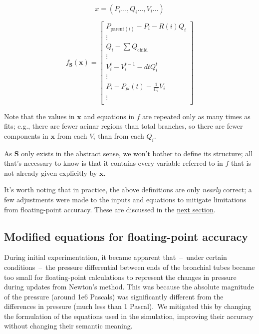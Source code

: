 \begin{equation*}
    x = (P_i..., Q_i..., V_i...)
\end{equation*}

\begin{equation*}
    f_{\bm{S}}(\bm{x}) =
        \begin{bmatrix}
            P_{\text{parent}(i)} - P_i - R(i)Q_i \\
            \vdots \\
            Q_i - \sum Q_{\text{child}} \\
            \vdots \\
            V_i^t - V_i^{t-1} - dtQ_i^t \\
            \vdots \\
            P_i - P_{pl}(t) - \frac{1}{C_i} V_i \\
            \vdots \\
        \end{bmatrix}
\end{equation*}

Note that the values in $\bm{x}$ and equations in $f$ are repeated only as many times as fits; e.g.,
there are fewer acinar regions than total branches, so there are fewer components in $\bm{x}$ from
each $V_i$ than from each $Q_i$.

As $\bm{S}$ only exists in the abstract sense, we won't bother to define its structure; all that's
necessary to know is that it contains every variable referred to in $f$ that is not already given
explicitly by $\bm{x}$.

\breakpars

It's worth noting that in practice, the above definitions are only \textit{nearly} correct; a few
adjustments were made to the inputs and equations to mitigate limitations from floating-point
accuracy. These are discussed in the \hyperref[sec:modified-equations]{next section}.

\subsection{Modified equations for floating-point accuracy} \label{sec:modified-equations}

During initial experimentation, it became apparent that~--~under certain conditions~--~the pressure
differential between ends of the bronchial tubes became too small for floating-point calculations to
represent the changes in pressure during updates from Newton's method. This was because the absolute
magnitude of the pressure (around 1e6 Pascals) was significantly different from the differences in
pressure (much less than 1 Pascal).\footnotemark\ We mitigated this by changing the formulation of
the equations used in the simulation, improving their accuracy without changing their semantic
meaning.

